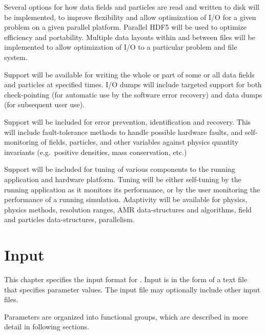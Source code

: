 \documentclass{book}
\begin{document}

   Several options for how data fields and particles are read and
   written to disk will be implemented, to improve flexibility and
   allow optimization of I/O for a given problem on a given parallel
   platform.  Parallel HDF5 will be used to optimize efficiency and
   portability.  Multiple data layouts within and between files will
   be implemented to allow optimization of I/O to a particular problem
   and file system.


   Support will be available for writing the whole or part of some or
   all data fields and particles at specified times.  I/O dumps will
   include targeted support for both check-pointing (for automatic use
   by the software error recovery) and data dumps (for subsequent user
   use).  
   

   Support will be included for error prevention, identification and
   recovery.  This will include fault-tolerance methods to handle
   possible hardware faults, and self-monitoring of fields, particles,
   and other variables against physics quantity invariants
   (e.g.~positive densities, mass conservation, etc.)


   Support will be included for tuning of various components to the
   running application and hardware platform.  Tuning will be either
   self-tuning by the running application as it monitors its
   performance, or by the user monitoring the performance of a running
   simulation.  Adaptivity will be available for physics, physics
   methods, resolution ranges, AMR data-structures and algorithms,
   field and particles data-structures, parallelism.

\chapter{Input} \label{s:inputs}

   This chapter specifies the input format for \cello.  Input is in
   the form of a text file that specifies parameter values.  The input
   file may optionally include other input files.

   Parameters are organized into functional groups, which are described
   in more detail in following sections.
\end{document}
